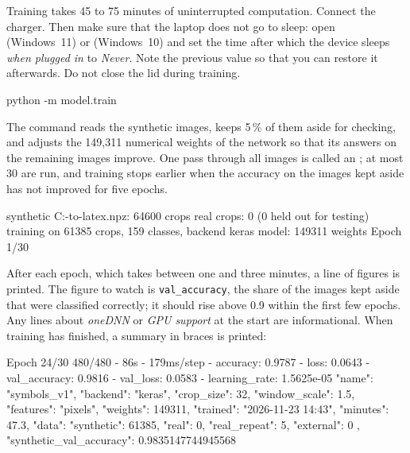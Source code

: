Training takes 45 to 75 minutes of uninterrupted computation. Connect the charger. Then make
sure that the laptop does not go to sleep: open \then{}\then{} (Windows~11) or \then{}\then{}
(Windows~10) and set the time after which the device sleeps \emph{when plugged in} to
\emph{Never}. Note the previous value so that you can restore it afterwards. Do not close the
lid during training.

\label{st:train}
\begin{ps}
python -m model.train
\end{ps}
The command reads the synthetic images, keeps 5\,\% of them aside for checking, and adjusts the
149{,}311 numerical weights of the network so that its answers on the remaining images improve.
One pass through all images is called an ; at most 30 are run, and training stops
earlier when the accuracy on the images kept aside has not improved for five epochs.
\begin{out}
synthetic C:\camera-to-latex\data\synthetic\train.npz: 64600 crops
real crops: 0 (0 held out for testing)
training on 61385 crops, 159 classes, backend keras
model: 149311 weights
Epoch 1/30
\end{out}
After each epoch, which takes between one and three minutes, a line of figures is printed. The
figure to watch is \texttt{val\_accuracy}, the share of the images kept aside that were
classified correctly; it should rise above 0.9 within the first few epochs. Any lines about
\emph{oneDNN} or \emph{GPU support} at the start are informational. When training has finished,
a summary in braces is printed:
\begin{out}
Epoch 24/30
480/480 - 86s - 179ms/step - accuracy: 0.9787 - loss: 0.0643 - val_accuracy: 0.9816 - val_loss: 0.0583 - learning_rate: 1.5625e-05
{
 "name": "symbols_v1",
 "backend": "keras",
 "crop_size": 32,
 "window_scale": 1.5,
 "features": "pixels",
 "weights": 149311,
 "trained": "2026-11-23 14:43",
 "minutes": 47.3,
 "data": {
  "synthetic": 61385,
  "real": 0,
  "real_repeat": 5,
  "external": 0
 },
 "synthetic_val_accuracy": 0.9835147744945568
}
\end{out}


